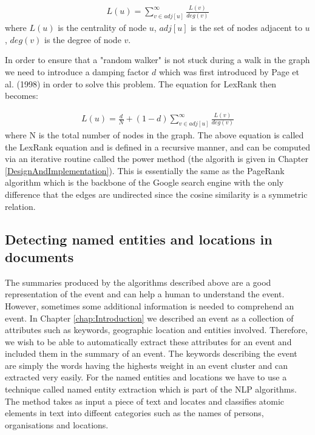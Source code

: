 \begin{eqnarray}
L(u) = \sum_{v \in adj[u]}^{\infty}\frac{L(v)}{deg(v)}
\end{eqnarray} 
where $L(u)$ is the centrality of node $u$, $adj[u]$ is the set of nodes adjacent to $u$, $deg(v)$ is the degree of node $v$.

In order to ensure that a "random walker" is not stuck during a walk in the graph we need to introduce a damping factor $d$ which was first introduced by Page et al. (1998) in order to solve this problem. The equation for LexRank then becomes:

\begin{eqnarray}\label{LexRankEquation}
L(u) = \frac{d}{N} + (1-d) \sum_{v \in adj[u]}^{\infty}\frac{L(v)}{deg(v)}
\end{eqnarray} 
where N is the total number of nodes in the graph. The above equation is called the LexRank equation and is deﬁned in a recursive manner, and can be computed via an iterative routine called the power method (the algorith is given in Chapter \ref{DesignAndImplementation}). This is essentially the same as the PageRank algorithm which is the backbone of the Google search engine with the only difference that the edges are undirected since the cosine similarity is a symmetric relation.

\subsection{Detecting named entities and locations in documents}
The summaries produced by the algorithms described above are a good representation of the event and can help a human to understand the event. However, sometimes some additional
information is needed to comprehend an event. In Chapter \ref{chap:Introduction} we described an event as a collection of attributes such as keywords, geographic location and entities involved. Therefore, we wish to be able to automatically extract these attributes for an event and included them in the summary of an event. The keywords describing the event are simply the words having the highests weight in an event cluster and can extracted very easily. For the named entities and locations we have to use a technique called named entity extraction which is part of the NLP algorithms. The method takes as input a piece of text and locates and classifies atomic elements in text into diffeent categories such as the names of persons, organisations and locations.


